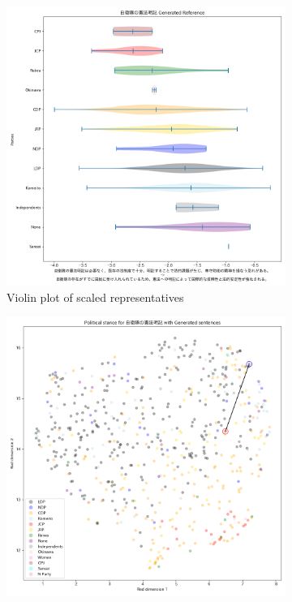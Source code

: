 \documentclass[final,5p,times,twocolumn,authoryear]{elsarticle}
\begin{document}
\begin{figure}[h]
\centering
    \begin{subfigure}{0.22\textwidth}
      \centering
      \includegraphics[width=1\linewidth]{figs/results/defence/自衛隊の憲法明記_gen_violin_plot.png}
      \caption{Violin plot of scaled representatives}
    \end{subfigure}
    \begin{subfigure}{0.22\textwidth}
      \centering
      \includegraphics[width=1\linewidth]{figs/results/defence/自衛隊の憲法明記_umap_gen.png}

\end{subfigure}
\end{figure}
\end{document}
